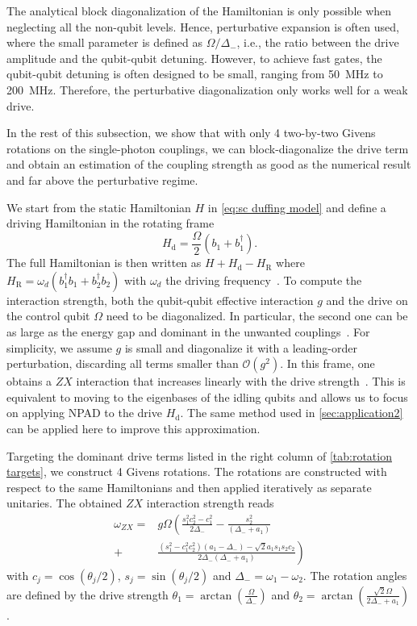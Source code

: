 \documentclass[%
 reprint,
 amsmath,amssymb,
 aps,
pra,
noeprint,
superscriptaddress,
]{revtex4-2}
\begin{document}
The analytical block diagonalization of the Hamiltonian is only possible when neglecting all the non-qubit levels.
Hence, perturbative expansion is often used, where the small parameter is defined as $\Omega/\Delta_{-}$, i.e., the ratio between the drive amplitude and the qubit-qubit detuning.
However, to achieve fast gates, the qubit-qubit detuning is often designed to be small, ranging from 50~MHz to 200~MHz.
Therefore, the perturbative diagonalization only works well for a weak drive.

In the rest of this subsection, we show that with only 4 two-by-two Givens rotations on the single-photon couplings, we can block-diagonalize the drive term and obtain an estimation of the coupling strength as good as the numerical result and far above the perturbative regime.

We start from the static Hamiltonian $H$ in \cref{eq:sc duffing model} and define a driving Hamiltonian in the rotating frame
\begin{equation}
    H_{\mathrm{d}} = \frac{\Omega}{2}(b_1 + b_1^{\dagger})
    .
\end{equation}
The full Hamiltonian is then written as $H+H_{\mathrm{d}}-H_{\mathrm{R}}$
where $H_{\mathrm{R}}=\omega_{d} (b_1^{\dagger} b_1 + b_2^{\dagger} b_2)$ with $\omega_{d}$ the driving frequency~\cite{Magesan2020}.
To compute the interaction strength, both the qubit-qubit effective interaction $g$ and the drive on the control qubit $\Omega$ need to be diagonalized.
In particular, the second one can be as large as the energy gap and dominant in the unwanted couplings~\cite{Malekakhlagh2021a}.
For simplicity, we assume $g$ is small and diagonalize it with a leading-order perturbation, discarding all terms smaller than $\mathcal{O}(g^2)$.
In this frame, one obtains a $ZX$ interaction that increases linearly with the drive strength~\cite{Magesan2020}.
This is equivalent to moving to the eigenbases of the idling qubits and allows us to focus on applying NPAD to the drive $H_{\mathrm{d}}$.
The same method used in \cref{sec:application2} can be applied here to improve this approximation.

Targeting the dominant drive terms listed in the right column of \cref{tab:rotation targets}, we construct 4 Givens rotations. 
The rotations are constructed with respect to the same Hamiltonians and then applied iteratively as separate unitaries.
The obtained $ZX$ interaction strength reads
\begin{align}
    \label{eq:analytical cr}
    \omega_{ZX} = & 
        g \Omega \left(
        \frac{s_1^2 c_2^2 - c_1^2}{2 \Delta_-}
        - \frac{s_2^2}{(\Delta_- + a_1)} \right.
        \\\nonumber
        + & 
        \left.
        \frac{(s_1^2 - c_1^2 c_2^2) ( a_1-\Delta_-) - \sqrt{2} a_1 s_1 s_2 c_2}{2 \Delta_- (\Delta_- + a_1)}
        \right)
\end{align}
with $c_j = \cos(\theta_j/2)$, $s_j = \sin(\theta_j/2)$ and $\Delta_- = \omega_1-\omega_2$.
The rotation angles are defined by the drive strength $\theta_1 = \arctan(\frac{\Omega}{\Delta_-})$
and
$\theta_2 = \arctan(\frac{\sqrt{2}\Omega}{2\Delta_-+a_1})$.
\end{document}
